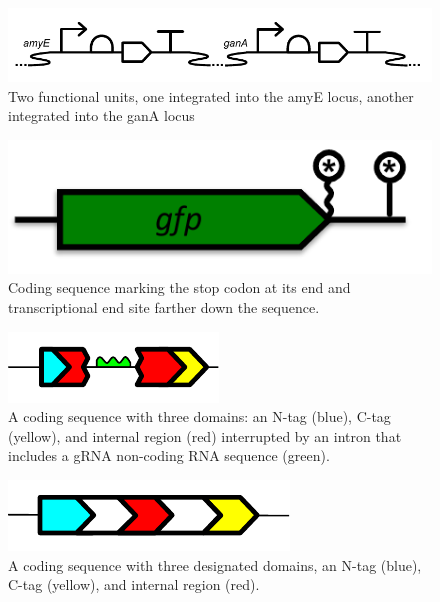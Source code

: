 {\begin{figure}[h!]
\includegraphics[scale=1.0]{figures/apdx-examples/apdx-exa18-chromosomal-locus-example2.pdf}
\caption{Two functional units, one integrated into the amyE locus, another integrated into the ganA locus}\label{f:apdx:exa18}
\end{figure}

\begin{figure}[h!]
\includegraphics[scale=0.5]{figures/apdx-examples/apdx-exa19-stop-sites.pdf}
\caption{Coding sequence marking the stop codon  at its end and transcriptional end site farther down the sequence.}
\label{f:apdx:exa19}
\end{figure}

\begin{figure}[h!]
\includegraphics[scale=1.0]{figures/apdx-examples/apdx-exa20-intron.pdf}
\caption{A coding sequence with three domains: an N-tag (blue), C-tag (yellow), and internal region (red) interrupted by an intron that includes a gRNA non-coding RNA sequence (green).}
\label{f:apdx:exa20}
\end{figure}

\begin{figure}[h!]
\includegraphics[scale=1.0]{figures/apdx-examples/apdx-exa21-polypeptide-region.pdf}
\caption{A coding sequence with three designated domains, an N-tag (blue), C-tag (yellow), and internal region (red).}
\label{f:apdx:exa21}
\end{figure}

}
